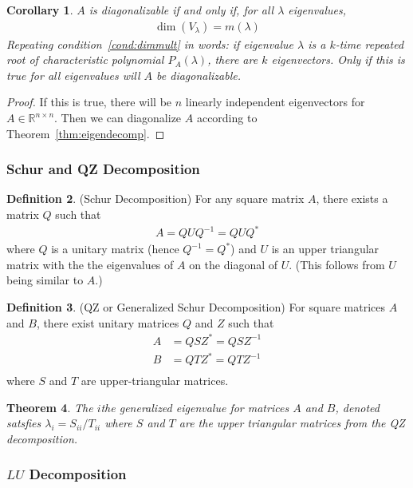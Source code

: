 \documentclass[12pt]{article}
\numberwithin{equation}{section} %
\theoremstyle{plain}
\newtheorem{thm}{Theorem}[section]
\newtheorem{cor}[thm]{Corollary}
\theoremstyle{definition}
\newtheorem{defn}[thm]{Definition}
\theoremstyle{remark}
\newcommand{\Rnn}{\mathbb{R}^{n\times n}}
\begin{document}
\begin{cor}
$A$ is diagonalizable if and only if, for all $\lambda$ eigenvalues,
\begin{align}
  \label{cond:dimmult}
  \dim(V_\lambda)=m(\lambda)
\end{align}
Repeating condition~\ref{cond:dimmult} in words: if eigenvalue $\lambda$
is a $k$-time repeated root of characteristic polynomial $P_A(\lambda)$,
there are $k$ eigenvectors. Only if this is true for all eigenvalues
will $A$ be diagonalizable.
\end{cor}
\begin{proof}
If this is true, there will be $n$ linearly independent eigenvectors for
$A\in \Rnn$. Then we can diagonalize $A$ according to
Theorem~\ref{thm:eigendecomp}.
\end{proof}


\subsubsection{Schur and QZ Decomposition}

\begin{defn}{(Schur Decomposition)}
For any square matrix $A$, there exists a matrix $Q$ such that
\begin{align*}
  A = Q U Q^{-1} = Q U Q^*
\end{align*}
where $Q$ is a unitary matrix (hence $Q^{-1} = Q^*$) and $U$ is an upper
triangular matrix with the the eigenvalues of $A$ on the diagonal of
$U$. (This follows from $U$ being similar to $A$.)
\end{defn}

\begin{defn}{(QZ or Generalized Schur Decomposition)}
For square matrices $A$ and $B$, there exist unitary matrices $Q$ and
$Z$ such that
\begin{align*}
  A &= Q S Z^* = QSZ^{-1} \\
  B &= Q T Z^* = QTZ^{-1} \\
\end{align*}
where $S$ and $T$ are upper-triangular matrices.
\end{defn}

\begin{thm}
The $i$the generalized eigenvalue for matrices $A$ and $B$, denoted
satsfies $\lambda_i = S_{ii} / T_{ii}$ where $S$ and $T$ are the upper
triangular matrices from the QZ decomposition.
\end{thm}

\subsubsection{$LU$ Decomposition}
\end{document}
